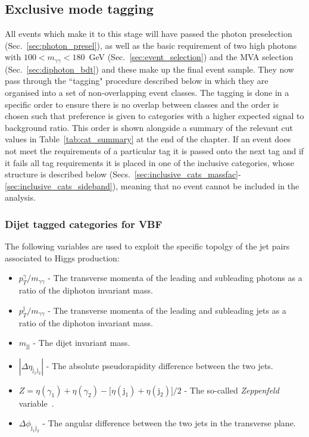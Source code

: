 \subsection{Exclusive mode tagging}
\label{sec:exclusive_tags}
All events which make it to this stage will have passed the photon preselection (Sec.~\ref{sec:photon_presel}), as well as the basic requirement of two high \pT photons with $100<m_{\gamma\gamma}<180$~GeV (Sec.~\ref{sec:event_selection}) and the MVA selection (Sec.~\ref{sec:diphoton_bdt}) and these make up the final event sample. They now pass through the ``tagging" procedure described below in which they are organised into a set of non-overlapping event classes. The tagging is done in a specific order to ensure there is no overlap between classes and the order is chosen such that preference is given to categories with a higher expected signal to background ratio. This order is shown alongside a summary of the relevant cut values in Table~\ref{tab:cat_summary} at the end of the chapter. If an event does not meet the requirements of a particular tag it is passed onto the next tag and if it fails all tag requirements it is placed in one of the inclusive categories, whose structure is described below (Secs.~\ref{sec:inclusive_cats_massfac}-\ref{sec:inclusive_cats_sideband}), meaning that no event cannot be included in the analysis. 

\subsubsection{Dijet tagged categories for VBF}
\label{sec:vbf_tag}

The following variables are used to exploit the specific topolgy of the jet pairs associated to \VBF Higgs production:

\begin{itemize}
  \item $p_{T}^{\gamma}/m_{\gamma\gamma}$ - The transverse momenta of the leading and subleading photons as a ratio of the diphoton invariant mass.
  \item $p_{T}^{\mathrm{j}}/m_{\gamma\gamma}$ - The transverse momenta of the leading and subleading jets as a ratio of the diphoton invariant mass.
  \item $m_{\mathrm{jj}}$ - The dijet invariant mass.
  \item $|\Delta\eta_{\mathrm{j}_{1}\mathrm{j}_{2}}|$ - The absolute pseudorapidity difference between the two jets.
  \item $Z = \eta(\gamma_{1})+\eta(\gamma_{2}) - \bigl[\eta(\mathrm{j}_{1})+\eta(\mathrm{j}_{2})\bigr]/2$ - The so-called \emph{Zeppenfeld} variable~\cite{Zeppenfeld}.
  \item $\Delta\phi_{\mathrm{j}_{1}\mathrm{j}_{2}}$ - The angular difference between the two jets in the transverse plane.
\end{itemize}

